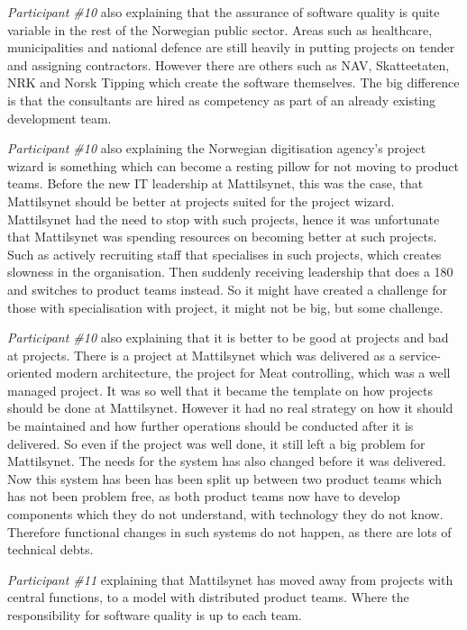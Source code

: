 \textit{Participant \#10} also explaining that the assurance of software quality is quite variable in the rest of the Norwegian public sector. Areas such as healthcare, municipalities and national defence are still heavily in putting projects on tender and assigning contractors. However there are others such as NAV, Skatteetaten, NRK and Norsk Tipping which create the software themselves. The big difference is that the consultants are hired as competency as part of an already existing development team. 

\textit{Participant \#10} also explaining the Norwegian digitisation agency's project wizard is something which can become a resting pillow for not moving to product teams. Before the new IT leadership at Mattilsynet, this was the case, that Mattilsynet should be better at projects suited for the project wizard. Mattilsynet had the need to stop with such projects, hence it was unfortunate that Mattilsynet was spending resources on becoming better at such projects. Such as actively recruiting staff that specialises in such projects, which creates slowness in the organisation. Then suddenly receiving leadership that does a 180 and switches to product teams instead. So it might have created a challenge for those with specialisation with project, it might not be big, but some challenge.

\textit{Participant \#10} also explaining that it is better to be good at projects and bad at projects. There is a project at Mattilsynet which was delivered as a service-oriented modern architecture, the project for Meat controlling, which was a well managed project. It was so well that it became the template on how projects should be done at Mattilsynet. However it had no real strategy on how it should be maintained and how further operations should be conducted after it is delivered. So even if the project was well done, it still left a big problem for Mattilsynet. The needs for the system has also changed before it was delivered. Now this system has been has been split up between two product teams which has not been problem free, as both product teams now have to develop components which they do not understand, with technology they do not know. Therefore functional changes in such systems do not happen, as there are lots of technical debts.

\textit{Participant \#11} explaining that Mattilsynet has moved away from projects with central functions, to a model with distributed product teams. Where the responsibility for software quality is up to each team. 

